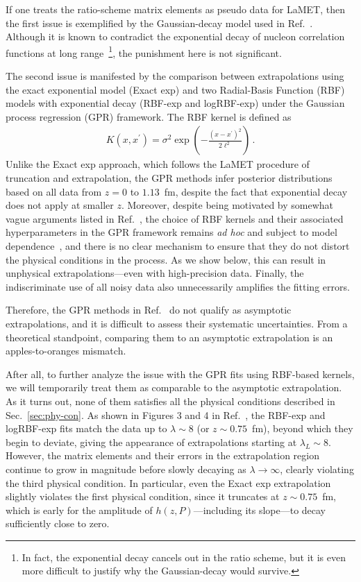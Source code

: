 \documentclass[prd,twocolumn,superscriptaddress,preprintnumbers,showpacs,nofootinbib,notitlepage,floatfix]{revtex4-2}
\DeclareRobustCommand{\sec}[1]{Sec.~\ref{sec:#1}}
\begin{document}
If one treats the ratio-scheme matrix elements as pseudo data for LaMET, then the first issue is exemplified by the Gaussian-decay model used in Ref.~\cite{Dutrieux:2025jed}. Although it is known to contradict the exponential decay of nucleon correlation functions at long range~\footnote{In fact, the exponential decay cancels out in the ratio scheme, but it is even more difficult to justify why the Gaussian-decay would survive.}, the punishment here is not significant. 

The second issue is manifested by the comparison between extrapolations using the exact exponential model (Exact exp) and two Radial-Basis Function (RBF) models with exponential decay (RBF-exp and logRBF-exp) under the Gaussian process regression (GPR) framework. The RBF kernel is defined as~\cite{Dutrieux:2024rem}
\begin{align}
    K\left(x, x^{\prime}\right)=\sigma^2 \exp \left(-\frac{\left( x -x^{\prime}\right)^2}{2 \ell^2}\right)\,.
\end{align}
Unlike the Exact exp approach, which follows the LaMET procedure of truncation and extrapolation, the GPR methods infer posterior distributions based on all data from $z = 0$ to $1.13$~fm, despite the fact that exponential decay does not apply at smaller $z$. Moreover, despite being motivated by somewhat vague arguments listed in Ref.~\cite{Dutrieux:2024rem}, the choice of RBF kernels and their associated hyperparameters in the GPR framework remains \textit{ad hoc} and subject to model dependence~\cite{Dutrieux:2025jed,Karpie:2019eiq,Dutrieux:2024rem}, and there is no clear mechanism to ensure that they do not distort the physical conditions in the process. As we show below, this can result in unphysical extrapolations---even with high-precision data. Finally, the indiscriminate use of all noisy data also unnecessarily amplifies the fitting errors.

Therefore, the GPR methods in Ref.~\cite{Dutrieux:2025jed} do not qualify as asymptotic extrapolations, and it is difficult to assess their systematic uncertainties. From a theoretical standpoint, comparing them to an asymptotic extrapolation is an apples-to-oranges mismatch.

After all, to further analyze the issue with the GPR fits using RBF-based kernels, we will temporarily treat them as comparable to the asymptotic extrapolation. As it turns out, none of them satisfies all the physical conditions described in \sec{phy-con}. As shown in Figures 3 and 4 in Ref.~\cite{Dutrieux:2025jed}, the RBF-exp and logRBF-exp fits match the data up to $\lambda \sim 8$ (or $z \sim 0.75$~fm), beyond which they begin to deviate, giving the appearance of extrapolations starting at $\lambda_L \sim 8$. However, the matrix elements and their errors in the extrapolation region continue to grow in magnitude before slowly decaying as $\lambda \to \infty$, clearly violating the third physical condition. In particular, even the Exact exp extrapolation slightly violates the first physical condition, since it truncates at $z \sim 0.75$~fm, which is early for the amplitude of $h(z, P)$---including its slope---to decay sufficiently close to zero.
\end{document}
